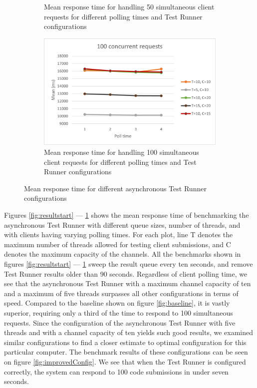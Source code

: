 \begin{figure}
\begin{subfigure}[b]{0.45\textwidth}
    \caption{Mean response time for handling 50 simultaneous client requests for different polling times and Test Runner configurations}
  \end{subfigure}
  \hfill
  \begin{subfigure}[b]{0.45\textwidth}
    \centering
    \includegraphics[width=\textwidth]{images/100.png}
    \caption{Mean response time for handling 100 simultaneous client requests for different polling times and Test Runner configurations}
    \label{fig:resultEnd}
  \end{subfigure}
\caption{Mean response time for different asynchronous Test Runner configurations}
\label{fig:configResults}
\end{figure}

Figures \ref{fig:resultstart} --- \ref{fig:resultEnd} shows the mean response time of benchmarking the asynchronous Test Runner with different queue sizes, number of threads, and with clients having varying polling times. 
For each plot, line T denotes the maximum number of threads allowed for testing client submissions, and C denotes the maximum capacity of the channels. 
All the benchmarks shown in figures \ref{fig:resultstart} --- \ref{fig:resultEnd} sweep the result queue every ten seconds, and remove Test Runner results older than 90 seconds. 
Regardless of client polling time, we see that the asynchronous Test Runner with a maximum channel capacity of ten and a maximum of five threads surpasses all other configurations in terms of speed.
Compared to the baseline shown on figure \ref{fig:baseline}, it is vastly superior, requiring only a third of the time to respond to 100 simultaneous requests. 
Since the configuration of the asynchronous Test Runner with five threads and with a channel capacity of ten yields such good results, we examined similar configurations to find a closer estimate to optimal configuration for this particular computer. 
The benchmark results of these configurations can be seen on figure \ref{fig:improvedConfig}.
We see that when the Test Runner is configured correctly, the system can respond to 100 code submissions in under seven seconds.


